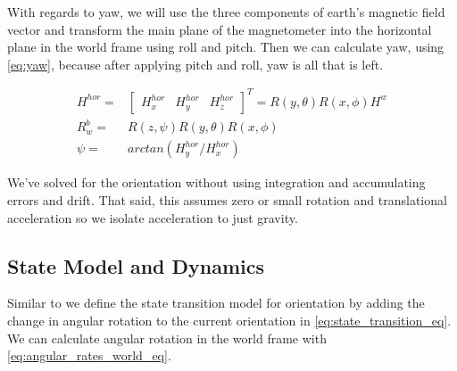 \documentclass[conference]{IEEEtran}
\begin{document}
With regards to yaw, we will use the three components of earth's magnetic field vector and transform the main plane of the magnetometer into the horizontal plane in the world frame using roll and pitch. Then we can calculate yaw, using \eqref{eq:yaw}, because after applying pitch and roll, yaw is all that is left.

\begin{align}
H^{hor} =& \begin{bmatrix} H_x^{hor}& H_y^{hor}& H_{z}^{hor}\end{bmatrix}^T = R(y, \theta) R(x, \phi) H^w \nonumber \\
R_w^b =& R(z, \psi) R(y, \theta) R(x, \phi)\\
\psi =& arctan(H_y^{hor} / H_x^{hor})\label{eq:yaw}
\end{align}

We've solved for the orientation without using integration and accumulating errors and drift. That said, this assumes zero or small rotation and translational acceleration so we isolate acceleration to just gravity.

\subsection{State Model and Dynamics}

Similar to \cite{b21} we define the state transition model for orientation by adding the change in angular rotation to the current orientation in \eqref{eq:state_transition_eq}. We can calculate angular rotation in the world frame with \eqref{eq:angular_rates_world_eq}.
\end{document}
